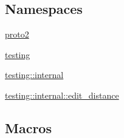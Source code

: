 \subsection*{Namespaces}
\begin{DoxyCompactItemize}
\item 
 \mbox{\hyperlink{namespaceproto2}{proto2}}
\item 
 \mbox{\hyperlink{namespacetesting}{testing}}
\item 
 \mbox{\hyperlink{namespacetesting_1_1internal}{testing\+::internal}}
\item 
 \mbox{\hyperlink{namespacetesting_1_1internal_1_1edit__distance}{testing\+::internal\+::edit\+\_\+distance}}
\end{DoxyCompactItemize}
\subsection*{Macros}
